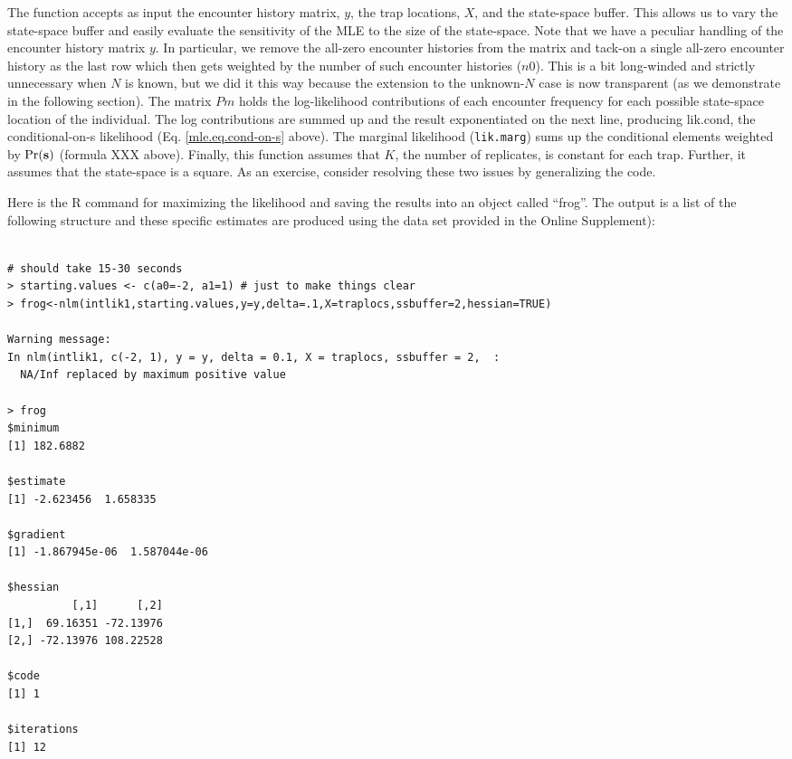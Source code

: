The function accepts as
input the encounter history matrix, $y$, the trap locations, $X$, and the
state-space buffer. This allows us to vary the state-space buffer and
easily evaluate the sensitivity of the MLE to the size of the
state-space. 
Note that we have a peculiar handling of the encounter history
matrix $y$. In particular, we remove the all-zero encounter histories
from the matrix and tack-on a single all-zero encounter history as the
last row which then gets weighted by the number of such encounter
histories ($n0$). This is a bit long-winded and strictly unnecessary
when $N$ is known, but we did it this way because the extension to the
unknown-$N$ case is now transparent (as we demonstrate in the following
section). 
 The matrix $Pm$ holds the log-likelihood contributions of
each encounter frequency for each possible state-space location of the
individual. 
The log contributions are summed up and the result
exponentiated on the next line, producing lik.cond, the
conditional-on-s likelihood (Eq. \ref{mle.eq.cond-on-s}
above). The marginal
likelihood (\mbox{\tt lik.marg}) sums up the conditional elements weighted by
$\Pr({\bf s})$ (formula XXX above).
Finally, this function assumes that $K$, the number
of replicates, is constant for each trap. Further, it assumes that the
state-space is a square. As an exercise, consider resolving these two
issues by generalizing the code.

Here is the R command for maximizing the likelihood and saving the
results into an object called “frog”.  The output is a list of the
following structure and these specific estimates are produced using
the data set provided in the Online Supplement):

{\small 
\begin{verbatim}

# should take 15-30 seconds
> starting.values <- c(a0=-2, a1=1) # just to make things clear
> frog<-nlm(intlik1,starting.values,y=y,delta=.1,X=traplocs,ssbuffer=2,hessian=TRUE)

Warning message:
In nlm(intlik1, c(-2, 1), y = y, delta = 0.1, X = traplocs, ssbuffer = 2,  :
  NA/Inf replaced by maximum positive value

> frog
$minimum
[1] 182.6882

$estimate
[1] -2.623456  1.658335

$gradient
[1] -1.867945e-06  1.587044e-06

$hessian
          [,1]      [,2]
[1,]  69.16351 -72.13976
[2,] -72.13976 108.22528

$code
[1] 1

$iterations
[1] 12
\end{verbatim}
}


